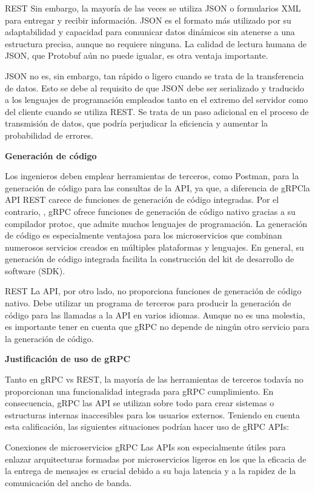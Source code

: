 REST Sin embargo, la mayoría de las veces se utiliza JSON o formularios XML para entregar y recibir información. JSON es el formato más utilizado por su adaptabilidad y capacidad para comunicar datos dinámicos sin atenerse a una estructura precisa, aunque no requiere ninguna. La calidad de lectura humana de JSON, que Protobuf aún no puede igualar, es otra ventaja importante.

JSON no es, sin embargo, tan rápido o ligero cuando se trata de la transferencia de datos. Esto se debe al requisito de que JSON debe ser serializado y traducido a los lenguajes de programación empleados tanto en el extremo del servidor como del cliente cuando se utiliza REST. Se trata de un paso adicional en el proceso de transmisión de datos, que podría perjudicar la eficiencia y aumentar la probabilidad de errores.


\textbf{Generación de código}

Los ingenieros deben emplear herramientas de terceros, como Postman, para la generación de código para las consultas de la API, ya que, a diferencia de gRPCla API REST carece de funciones de generación de código integradas. Por el contrario, , gRPC ofrece funciones de generación de código nativo gracias a su compilador protoc, que admite muchos lenguajes de programación. La generación de código es especialmente ventajosa para los microservicios que combinan numerosos servicios creados en múltiples plataformas y lenguajes. En general, su generación de código integrada facilita la construcción del kit de desarrollo de software (SDK).

REST La API, por otro lado, no proporciona funciones de generación de código nativo. Debe utilizar un programa de terceros para producir la generación de código para las llamadas a la API en varios idiomas. Aunque no es una molestia, es importante tener en cuenta que gRPC no depende de ningún otro servicio para la generación de código.

\textbf{Justificación de uso de gRPC}

Tanto en gRPC vs REST, la mayoría de las herramientas de terceros todavía no proporcionan una funcionalidad integrada para gRPC cumplimiento. En consecuencia, gRPC las API se utilizan sobre todo para crear sistemas o estructuras internas inaccesibles para los usuarios externos. Teniendo en cuenta esta calificación, las siguientes situaciones podrían hacer uso de gRPC APIs:

Conexiones de microservicios
gRPC Las APIs son especialmente útiles para enlazar arquitecturas formadas por microservicios ligeros en los que la eficacia de la entrega de mensajes es crucial debido a su baja latencia y a la rapidez de la comunicación del ancho de banda.

